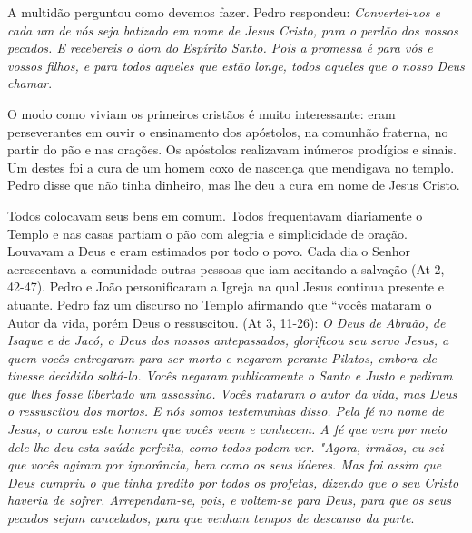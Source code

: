 \documentclass[
]{book}
\begin{document}
A multidão perguntou como devemos fazer. Pedro respondeu: \emph{Convertei-vos e cada um de vós seja batizado em nome de Jesus Cristo, para o perdão dos vossos pecados. E recebereis o dom do Espírito Santo. Pois a promessa é para vós e vossos filhos, e para todos aqueles que estão longe, todos aqueles que o nosso Deus chamar}.

O modo como viviam os primeiros cristãos é muito interessante: eram perseverantes em ouvir o ensinamento dos apóstolos, na comunhão fraterna, no partir do pão e nas orações. Os apóstolos realizavam inúmeros prodígios e sinais. Um destes foi a cura de um homem coxo de nascença que mendigava no templo. Pedro disse que não tinha dinheiro, mas lhe deu a cura em nome de Jesus Cristo.

Todos colocavam seus bens em comum. Todos frequentavam diariamente o Templo e nas casas partiam o pão com alegria e simplicidade de oração. Louvavam a Deus e eram estimados por todo o povo. Cada dia o Senhor acrescentava a comunidade outras pessoas que iam aceitando a salvação (At 2, 42-47). Pedro e João personificaram a Igreja na qual Jesus continua presente e atuante. Pedro faz um discurso no Templo afirmando que ``vocês mataram o Autor da vida, porém Deus o ressuscitou. (At 3, 11-26): \emph{O Deus de Abraão, de Isaque e de Jacó, o Deus dos nossos antepassados, glorificou seu servo Jesus, a quem vocês entregaram para ser morto e negaram perante Pilatos, embora ele tivesse decidido soltá-lo. Vocês negaram publicamente o Santo e Justo e pediram que lhes fosse libertado um assassino. Vocês mataram o autor da vida, mas Deus o ressuscitou dos mortos. E nós somos testemunhas disso. Pela fé no nome de Jesus, o curou este homem que vocês veem e conhecem. A fé que vem por meio dele lhe deu esta saúde perfeita, como todos podem ver. "Agora, irmãos, eu sei que vocês agiram por ignorância, bem como os seus líderes. Mas foi assim que Deus cumpriu o que tinha predito por todos os profetas, dizendo que o seu Cristo haveria de sofrer. Arrependam-se, pois, e voltem-se para Deus, para que os seus pecados sejam cancelados, para que venham tempos de descanso da parte}.
\end{document}
